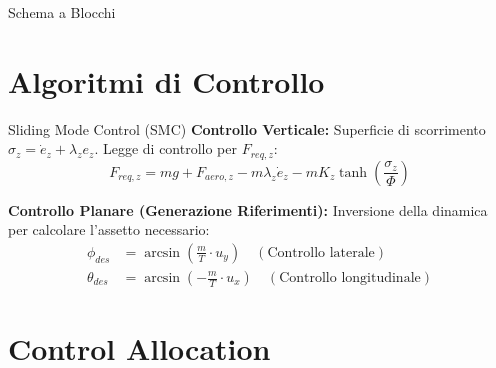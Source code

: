\documentclass[demo]{beamer} %
\begin{document}
\begin{frame}{Schema a Blocchi}
{
    }
\end{frame}

\section{Algoritmi di Controllo}

\begin{frame}{Sliding Mode Control (SMC)}
    \textbf{Controllo Verticale:}
    Superficie di scorrimento $\sigma_z = \dot{e}_z + \lambda_z e_z$. Legge di controllo per $F_{req,z}$:
    \begin{equation}
        F_{req,z} = m g + F_{aero,z} - m \lambda_z \dot{e}_z - m K_z \tanh\left(\frac{\sigma_z}{\Phi}\right)
    \end{equation}
    
    \vspace{0.5cm}
    \textbf{Controllo Planare (Generazione Riferimenti):}
    Inversione della dinamica per calcolare l'assetto necessario:
    \begin{align}
        \phi_{des} &= \arcsin\left( \frac{m}{T} \cdot u_y \right) \quad (\text{Controllo laterale}) \\
        \theta_{des} &= \arcsin\left( - \frac{m}{T} \cdot u_x \right) \quad (\text{Controllo longitudinale})
    \end{align}
\end{frame}

\section{Control Allocation}
\end{document}
